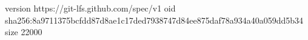 version https://git-lfs.github.com/spec/v1
oid sha256:8a9711375bcfdd87d8ae1c17ded7938747d84ee875daf78a934a40a059dd5b34
size 22000
